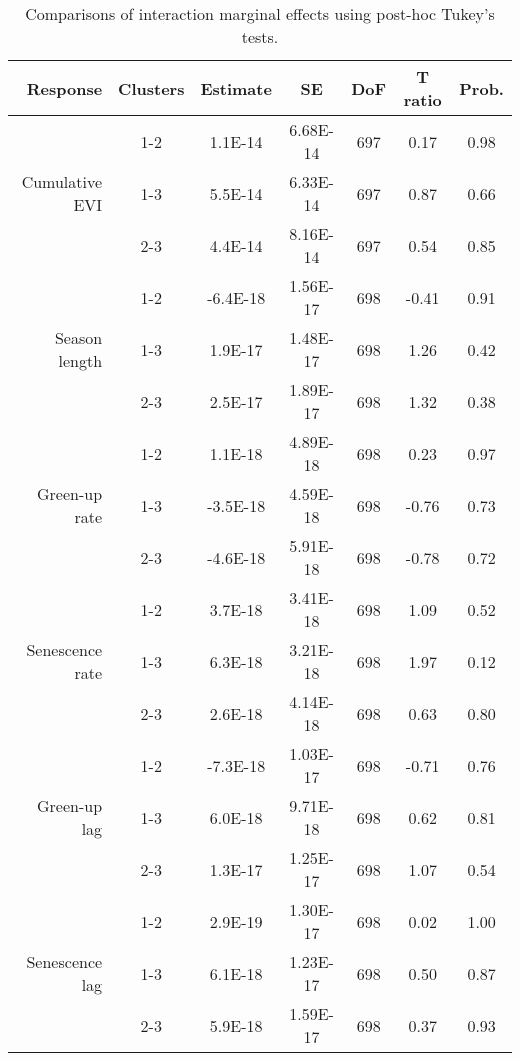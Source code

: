 \begin{table}[H]
\centering
\begin{tabular}{rcccccc}
  \hline
Response & Clusters & Estimate & SE & DoF & T ratio & Prob. \\ 
  \hline
\multirow{3}{*}{Cumulative EVI} & 1-2 & 1.1E-14 & 6.68E-14 & 697 & 0.17 & 0.98 \\ 
& 1-3 & 5.5E-14 & 6.33E-14 & 697 & 0.87 & 0.66 \\ 
& 2-3 & 4.4E-14 & 8.16E-14 & 697 & 0.54 & 0.85 \\ 
   \hline
\multirow{3}{*}{Season length} & 1-2 & -6.4E-18 & 1.56E-17 & 698 & -0.41 & 0.91 \\ 
& 1-3 & 1.9E-17 & 1.48E-17 & 698 & 1.26 & 0.42 \\ 
& 2-3 & 2.5E-17 & 1.89E-17 & 698 & 1.32 & 0.38 \\ 
   \hline
\multirow{3}{*}{Green-up rate} & 1-2 & 1.1E-18 & 4.89E-18 & 698 & 0.23 & 0.97 \\ 
& 1-3 & -3.5E-18 & 4.59E-18 & 698 & -0.76 & 0.73 \\ 
& 2-3 & -4.6E-18 & 5.91E-18 & 698 & -0.78 & 0.72 \\ 
   \hline
\multirow{3}{*}{Senescence rate} & 1-2 & 3.7E-18 & 3.41E-18 & 698 & 1.09 & 0.52 \\ 
& 1-3 & 6.3E-18 & 3.21E-18 & 698 & 1.97 & 0.12 \\ 
& 2-3 & 2.6E-18 & 4.14E-18 & 698 & 0.63 & 0.80 \\ 
   \hline
\multirow{3}{*}{Green-up lag} & 1-2 & -7.3E-18 & 1.03E-17 & 698 & -0.71 & 0.76 \\ 
& 1-3 & 6.0E-18 & 9.71E-18 & 698 & 0.62 & 0.81 \\ 
& 2-3 & 1.3E-17 & 1.25E-17 & 698 & 1.07 & 0.54 \\ 
   \hline
\multirow{3}{*}{Senescence lag} & 1-2 & 2.9E-19 & 1.30E-17 & 698 & 0.02 & 1.00 \\ 
& 1-3 & 6.1E-18 & 1.23E-17 & 698 & 0.50 & 0.87 \\ 
& 2-3 & 5.9E-18 & 1.59E-17 & 698 & 0.37 & 0.93 \\ 
  \end{tabular}
\caption{Comparisons of interaction marginal effects using post-hoc Tukey's tests.} 
\label{lsq_terms}
\end{table}

